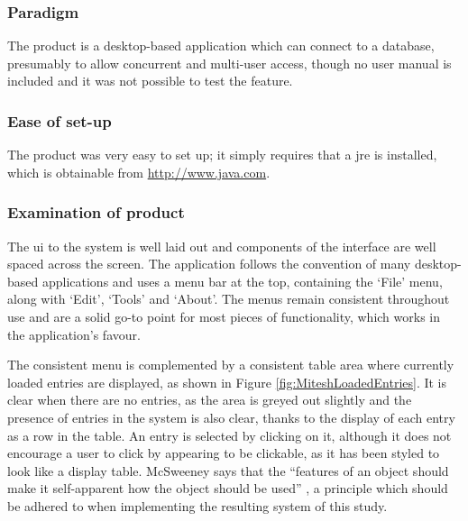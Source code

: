 \subsubsection{Paradigm}
The product is a desktop-based application which can connect to a database, presumably to allow concurrent and multi-user access, though no user manual is included and it was not possible to test the feature.

\subsubsection{Ease of set-up}
The product was very easy to set up; it simply requires that a \gls{jre} is installed, which is obtainable from \url{http://www.java.com}.

\subsubsection{Examination of product}
The \gls{ui} to the system is well laid out and components of the interface are well spaced across the screen. The application follows the convention of many desktop-based applications and uses a menu bar at the top, containing the `File' menu, along with `Edit', `Tools' and `About'.  The menus remain consistent throughout use and are a solid go-to point for most pieces of functionality, which works in the application's favour.

The consistent menu is complemented by a consistent table area where currently loaded entries are displayed, as shown in Figure \ref{fig:MiteshLoadedEntries}.  It is clear when there are no entries, as the area is greyed out slightly and the presence of entries in the system is also clear, thanks to the display of each entry as a row in the table.  An entry is selected by clicking on it, although it does not encourage a user to click by appearing to be clickable, as it has been styled to look like a display table.  McSweeney says that the ``features of an object should make it self-apparent how the object should be used'' \cite{affordance}, a principle which should be adhered to when implementing the resulting system of this study.

